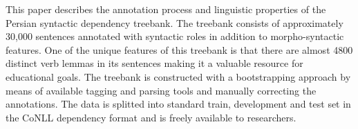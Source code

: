 This paper describes the annotation process and linguistic properties of the Persian syntactic dependency treebank. The treebank consists of approximately
 30,000 sentences annotated with syntactic roles in addition to morpho-syntactic
 features. One of the unique features of this treebank is that there are almost
 4800 distinct verb lemmas in its sentences making it a valuable resource for
 educational goals. The treebank is constructed with a bootstrapping approach by
 means of available tagging and parsing tools and manually correcting the
 annotations. The data is splitted into standard train, development and test set
 in the CoNLL dependency format and is freely available to researchers.

